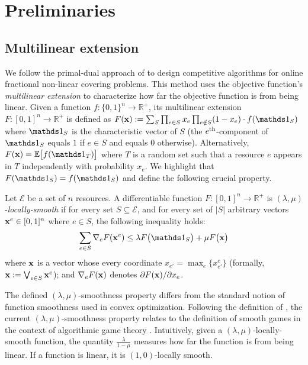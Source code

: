 \section{Preliminaries} \label{sec-prelim}

\subsection{Multilinear extension}

We follow the primal-dual approach of \cite{Thang20:Online-Primal-Dual} to design competitive algorithms for online fractional non-linear covering problems. This method uses the objective function's \emph{multilinear extension} to characterize how far the objective function is from being linear. Given a function $f: \{0,1\}^{n} \rightarrow \mathbb{R}^{+}$, its multilinear extension $F: [0,1]^{n} \rightarrow \mathbb{R}^{+}$
is defined as $F(\vect{x}) := \sum_{S} \prod_{e \in S} x_{e} \prod_{e \notin S} (1 - x_{e}) \cdot f(\one_{S})$
where $\one_{S}$ is the characteristic vector of $S$ (the $e^{\textnormal{th}}$-component of
$\one_{S}$ equals $1$ if $e \in S$ and equals 0 otherwise).
Alternatively, $F(\vect{x}) = \mathbb{E} \bigl[ f(\one_{T})\bigr]$ where $T$ is a random set
such that a resource $e$ appears in $T$ independently with probability $x_{e}$. We highlight that $F(\one_{S}) = f(\one_{S})$ and define the following crucial property.

\setcounter{theorem}{0}
\begin{definition}	\label{def:min-local-smooth}
Let $\mathcal{E}$ be a set of $n$ resources.
A differentiable function $F: [0,1]^{n} \rightarrow \mathbb{R}^{+}$ is $(\lambda,\mu)$-\emph{locally-smooth}
if for every set $S \subseteq \mathcal{E}$, and for every set of $|S|$ arbitrary vectors $\mathbf{x}^{e} \in [0,1]^{n}$ where $e \in S$, the following inequality holds:
\begin{equation*}	\label{eq:min-local-smooth}
\sum_{e \in S} \nabla_{e} F(\vect{x}^{e}) \leq \lambda F\bigl( \one_{S} \bigr) + \mu F\bigl( \vect{x} \bigr)
\end{equation*}
where $\mathbf{x}$ is a vector whose every coordinate $x_{e'} = \max_{e}\{x^{e}_{e'}\}$ (formally, $\mathbf{x} := \bigvee_{e \in S} \mathbf{x}^{e}$);
and $\nabla_{e} F(\mathbf{x})$ denotes $\partial F(\mathbf{x})/\partial x_{e}$.
\end{definition}

The defined $(\lambda,\mu)$-smoothness property differs from the standard notion of function smoothness used in
convex optimization. Following the definition of \cite{Thang20:Online-Primal-Dual}, the current $(\lambda,\mu)$-smoothness property relates to the definition of smooth games in the context of algorithmic game theory \citep{Roughgarden15:Intrinsic-Robustness}. Intuitively, given a $(\lambda,\mu)$-locally-smooth function,
the quantity $\frac{\lambda}{1-\mu}$ measures how far the function is from being linear. If a function is linear, it is $(1,0)$-locally smooth.

